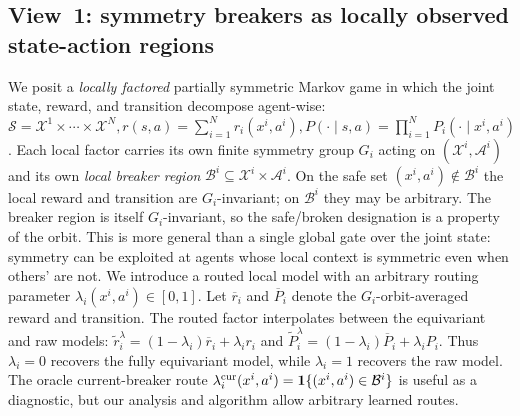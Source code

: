 \documentclass[11pt]{article}
\begin{document}
\subsection{View~1: symmetry breakers as locally observed state-action regions}
We posit a \emph{locally factored} partially symmetric Markov game in which the
joint state, reward, and transition decompose agent-wise:
$
\mathcal{S} = \mathcal{X}^1 \times \cdots \times \mathcal{X}^N,
r(s,a) = \sum_{i=1}^N r_i(x^i, a^i),
P(\cdot \mid s, a) = \prod_{i=1}^N P_i(\cdot \mid x^i, a^i)
$.
Each local factor carries its own finite symmetry group $G_i$ acting on $(\mathcal{X}^i, \mathcal{A}^i)$ and its own \emph{local breaker region} $\mathcal{B}^i \subseteq \mathcal{X}^i \times \mathcal{A}^i$. On the safe set $(x^i, a^i) \notin \mathcal{B}^i$ the local reward and transition are $G_i$-invariant; on $\mathcal{B}^i$ they may be arbitrary. The breaker region is itself $G_i$-invariant, so the safe/broken designation is a property of the orbit. This is more general than a single global gate over the joint state: symmetry can be exploited at agents whose local context is symmetric even when others' are not.
We introduce a routed local model with an arbitrary routing parameter $\lambda_i(x^i,a^i) \in [0,1]$. Let $\overline r_i$ and $\overline P_i$ denote the $G_i$-orbit-averaged reward and transition. The routed factor interpolates between the equivariant and raw models: $\widetilde r_i^\lambda=(1-\lambda_i)\overline r_i+\lambda_i r_i$ and $\widetilde P_i^\lambda=(1-\lambda_i)\overline P_i+\lambda_i P_i$. Thus $\lambda_i=0$ recovers the fully equivariant model, while $\lambda_i=1$ recovers the raw model. The oracle current-breaker route $\lambda_i^{\rm cur}(x^i,a^i)=\mathbf{1}\{(x^i,a^i)\in\mathcal B^i\}$ is useful as a diagnostic, but our analysis and algorithm allow arbitrary learned routes.
\end{document}
